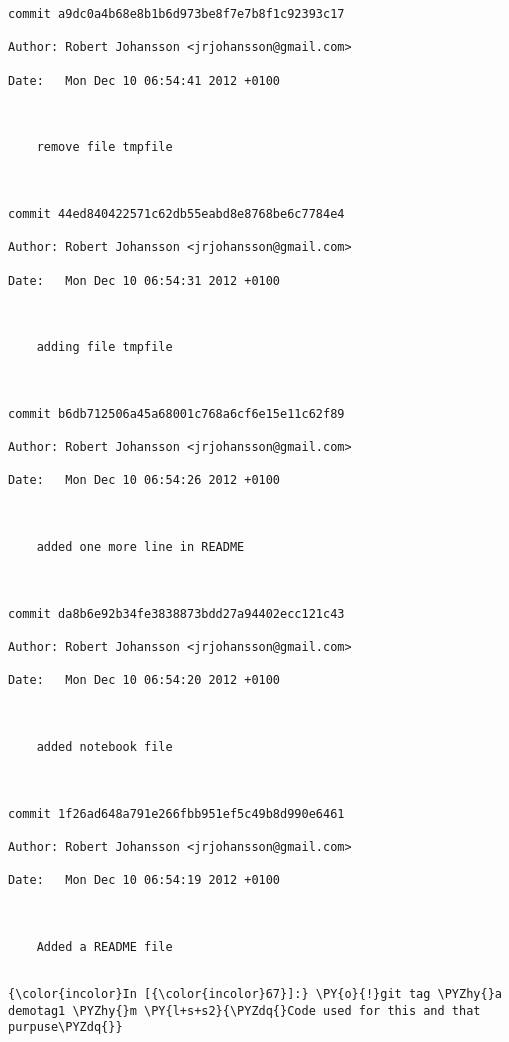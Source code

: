     \begin{Verbatim}[commandchars=\\\{\}]
commit a9dc0a4b68e8b1b6d973be8f7e7b8f1c92393c17

Author: Robert Johansson <jrjohansson@gmail.com>

Date:   Mon Dec 10 06:54:41 2012 +0100



    remove file tmpfile



commit 44ed840422571c62db55eabd8e8768be6c7784e4

Author: Robert Johansson <jrjohansson@gmail.com>

Date:   Mon Dec 10 06:54:31 2012 +0100



    adding file tmpfile



commit b6db712506a45a68001c768a6cf6e15e11c62f89

Author: Robert Johansson <jrjohansson@gmail.com>

Date:   Mon Dec 10 06:54:26 2012 +0100



    added one more line in README



commit da8b6e92b34fe3838873bdd27a94402ecc121c43

Author: Robert Johansson <jrjohansson@gmail.com>

Date:   Mon Dec 10 06:54:20 2012 +0100



    added notebook file



commit 1f26ad648a791e266fbb951ef5c49b8d990e6461

Author: Robert Johansson <jrjohansson@gmail.com>

Date:   Mon Dec 10 06:54:19 2012 +0100



    Added a README file


    \end{Verbatim}

    \begin{Verbatim}[commandchars=\\\{\}]
{\color{incolor}In [{\color{incolor}67}]:} \PY{o}{!}git tag \PYZhy{}a demotag1 \PYZhy{}m \PY{l+s+s2}{\PYZdq{}Code used for this and that purpuse\PYZdq{}} 
\end{Verbatim}

